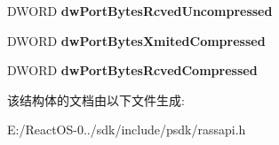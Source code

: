 \begin{DoxyCompactItemize}
\mbox{\label{struct___r_a_s___p_o_r_t___s_t_a_t_i_s_t_i_c_s_aa94620e96a72296ca607e35bca5114c6}} 
D\+W\+O\+RD {\bfseries dw\+Port\+Bytes\+Rcved\+Uncompressed}
\item 
\mbox{\label{struct___r_a_s___p_o_r_t___s_t_a_t_i_s_t_i_c_s_a8fe57eef1f3f5420d660a6c7d89a0888}} 
D\+W\+O\+RD {\bfseries dw\+Port\+Bytes\+Xmited\+Compressed}
\item 
\mbox{\label{struct___r_a_s___p_o_r_t___s_t_a_t_i_s_t_i_c_s_a308d4fc9c50ac734ba18f1a6328f9942}} 
D\+W\+O\+RD {\bfseries dw\+Port\+Bytes\+Rcved\+Compressed}
\end{DoxyCompactItemize}


该结构体的文档由以下文件生成\+:\begin{DoxyCompactItemize}
\item 
E\+:/\+React\+O\+S-\/0../sdk/include/psdk/rassapi.\+h\end{DoxyCompactItemize}
